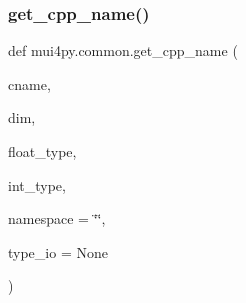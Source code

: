 \mbox{\label{namespacemui4py_1_1common_a8f531059394175fc673a1f67fcd90cc6}} 
\subsubsection{\texorpdfstring{get\+\_\+cpp\+\_\+name()}{get\_cpp\_name()}}
{\footnotesize\ttfamily def mui4py.\+common.\+get\+\_\+cpp\+\_\+name (\begin{DoxyParamCaption}\item[{}]{cname,  }\item[{}]{dim,  }\item[{}]{float\+\_\+type,  }\item[{}]{int\+\_\+type,  }\item[{}]{namespace = {\ttfamily \char`\"{}\char`\"{}},  }\item[{}]{type\+\_\+io = {\ttfamily None} }\end{DoxyParamCaption})}

